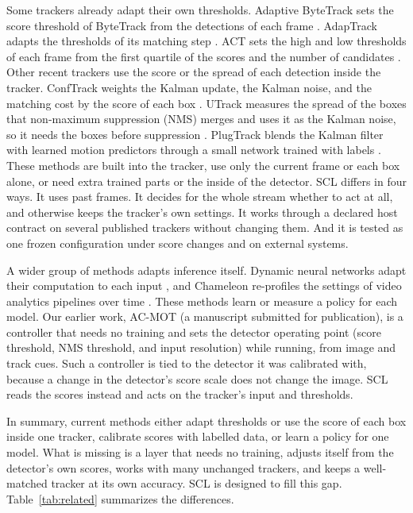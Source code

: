 \documentclass[pdflatex,sn-mathphys-num,iicol]{sn-jnl}
\newcommand{\scl}{SCL}
\begin{document}
Some trackers already adapt their own thresholds. Adaptive ByteTrack sets the
score threshold of ByteTrack from the detections of each frame
\cite{ma2023adaptivebytetrack}. AdapTrack adapts the thresholds of its
matching step \cite{shim2024adaptrack}. ACT sets the high and low thresholds
of each frame from the first quartile of the scores and the number of
candidates \cite{act2026adaptive}. Other recent trackers use the score or the
spread of each detection inside the tracker. ConfTrack weights the Kalman
update, the Kalman noise, and the matching cost by the score of each box
\cite{jung2024conftrack}. UTrack measures the spread of the boxes that
non-maximum suppression (NMS) merges and uses it as the Kalman noise, so it needs the
boxes before suppression \cite{solano2025utrack}. PlugTrack blends the Kalman
filter with learned motion predictors through a small network trained with
labels \cite{kim2026plugtrack}. These methods are built into the tracker, use
only the current frame or each box alone, or need extra trained parts or the
inside of the detector. \scl{} differs in four ways. It uses past
frames. It decides for the whole stream whether to act at all, and otherwise
keeps the tracker's own settings. It works through a declared host contract
on several published trackers without changing them. And it is tested as one
frozen configuration under score changes and on external systems.

A wider group of methods adapts inference itself. Dynamic neural networks
adapt their computation to each input \cite{han2022dynamic}, and Chameleon
re-profiles the settings of video analytics pipelines over time
\cite{jiang2018chameleon}. These methods learn or measure a policy for each
model. Our earlier work, AC-MOT (a manuscript submitted for publication), is a controller that
needs no training and sets the detector operating point (score threshold,
NMS threshold, and input resolution) while running, from image and track
cues. Such a controller is tied to the detector it was calibrated with,
because a change in the detector's score scale does not change the image.
\scl{} reads the scores instead and acts on the tracker's input and
thresholds.

In summary, current methods either adapt thresholds or use the score of each
box inside one tracker, calibrate scores with labelled data, or learn a policy
for one model. What is missing is a layer that needs no training, adjusts itself
from the detector's own scores, works with many unchanged trackers, and keeps
a well-matched tracker at its own accuracy. \scl{} is designed to fill this
gap. Table~\ref{tab:related} summarizes the differences.
\end{document}
